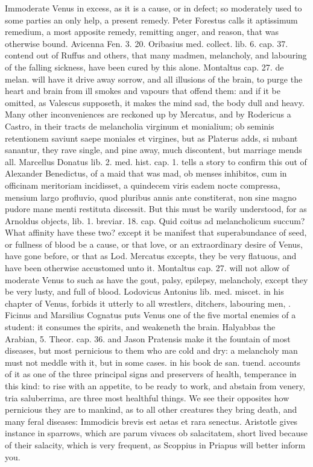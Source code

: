 {Immoderate Venus in excess, as it is a cause, or in defect; so
moderately used to some parties an only help, a present remedy. Peter
Forestus calls it aptissimum remedium, a most apposite remedy,
remitting anger, and reason, that was otherwise bound. Avicenna
Fen. 3. 20. Oribasius med. collect. lib. 6. cap. 37. contend out of
Ruffus and others,  that many madmen, melancholy, and labouring
of the falling sickness, have been cured by this alone. Montaltus cap.
27. de melan. will have it drive away sorrow, and all illusions of the
brain, to purge the heart and brain from ill smokes and vapours that
offend them: and if it be omitted, as Valescus supposeth, it
makes the mind sad, the body dull and heavy. Many other inconveniences
are reckoned up by Mercatus, and by Rodericus a Castro, in their tracts
de melancholia virginum et monialium; ob seminis retentionem saviunt
saepe moniales et virgines, but as Platerus adds, si nubant sanantur,
they rave single, and pine away, much discontent, but marriage mends
all. Marcellus Donatus lib. 2. med. hist. cap. 1. tells a story to
confirm this out of Alexander Benedictus, of a maid that was mad, ob
menses inhibitos, cum in officinam meritoriam incidisset, a quindecem
viris eadem nocte compressa, mensium largo profluvio, quod pluribus
annis ante constiterat, non sine magno pudore mane menti restituta
discessit. But this must be warily understood, for as Arnoldus objects,
lib. 1. breviar. 18. cap. Quid coitus ad melancholicum succum? What
affinity have these two? except it be manifest that
superabundance of seed, or fullness of blood be a cause, or that love,
or an extraordinary desire of Venus, have gone before, or that as Lod.
Mercatus excepts, they be very flatuous, and have been otherwise
accustomed unto it. Montaltus cap. 27. will not allow of moderate Venus
to such as have the gout, palsy, epilepsy, melancholy, except they be
very lusty, and full of blood. Lodovicus Antonius lib. med.
miscet. in his chapter of Venus, forbids it utterly to all wrestlers,
ditchers, labouring men, \etc{}. Ficinus and Marsilius Cognatus
puts Venus one of the five mortal enemies of a student: it consumes the
spirits, and weakeneth the brain. Halyabbas the Arabian, 5. Theor. cap.
36. and Jason Pratensis make it the fountain of most diseases,
but most pernicious to them who are cold and dry: a melancholy
man must not meddle with it, but in some cases. \Plutarch in his book \textlatin{de
san. tuend.} accounts of it as one of the three principal signs and
preservers of health, temperance in this kind: to rise with an
appetite, to be ready to work, and abstain from venery, tria
saluberrima, are three most healthful things. We see their opposites
how pernicious they are to mankind, as to all other creatures they
bring death, and many feral diseases: Immodicis brevis est aetas et
rara senectus. Aristotle gives instance in sparrows, which are parum
vivaces ob salacitatem, short lived because of their salacity,
which is very frequent, as Scoppius in Priapus will better inform you.

}
